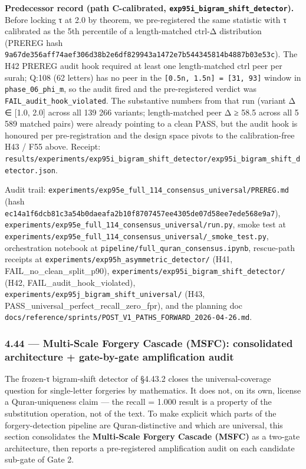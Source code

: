 \documentclass[
]{article}
\begin{document}
\textbf{Predecessor record (path C-calibrated,
\texttt{exp95i\_bigram\_shift\_detector}).} Before locking τ at 2.0 by
theorem, we pre-registered the same statistic with τ calibrated as the
5th percentile of a length-matched ctrl-Δ distribution (PREREG hash
\texttt{9a67de356aff74aef306d38b2e6df829943a1472e7b544345814b4887b03e53c}).
The H42 PREREG audit hook required at least one length-matched ctrl peer
per surah; Q:108 (62 letters) has no peer in the
\texttt{{[}0.5n,\ 1.5n{]}\ =\ {[}31,\ 93{]}} window in
\texttt{phase\_06\_phi\_m}, so the audit fired and the pre-registered
verdict was \texttt{FAIL\_audit\_hook\_violated}. The substantive
numbers from that run (variant Δ ∈ {[}1.0, 2.0{]} across all 139 266
variants; length-matched peer Δ ≥ 58.5 across all 5 589 matched pairs)
were already pointing to a clean PASS, but the audit hook is honoured
per pre-registration and the design space pivots to the calibration-free
H43 / F55 above. Receipt:
\texttt{results/experiments/exp95i\_bigram\_shift\_detector/exp95i\_bigram\_shift\_detector.json}.

Audit trail:
\texttt{experiments/exp95e\_full\_114\_consensus\_universal/PREREG.md}
(hash
\texttt{ec14a1f6dcb81c3a54b0daeafa2b10f8707457ee4305de07d58ee7ede568e9a7}),
\texttt{experiments/exp95e\_full\_114\_consensus\_universal/run.py},
smoke test at
\texttt{experiments/exp95e\_full\_114\_consensus\_universal/\_smoke\_test.py},
orchestration notebook at
\texttt{pipeline/full\_quran\_consensus.ipynb}, rescue-path receipts at
\texttt{experiments/exp95h\_asymmetric\_detector/} (H41,
FAIL\_no\_clean\_split\_p90),
\texttt{experiments/exp95i\_bigram\_shift\_detector/} (H42,
FAIL\_audit\_hook\_violated),
\texttt{experiments/exp95j\_bigram\_shift\_universal/} (H43,
PASS\_universal\_perfect\_recall\_zero\_fpr), and the planning doc
\texttt{docs/reference/sprints/POST\_V1\_PATHS\_FORWARD\_2026-04-26.md}.

\subsubsection{4.44 --- Multi-Scale Forgery Cascade (MSFC): consolidated
architecture + gate-by-gate amplification
audit}\label{multi-scale-forgery-cascade-msfc-consolidated-architecture-gate-by-gate-amplification-audit}

The frozen-τ bigram-shift detector of §4.43.2 closes the
universal-coverage question for single-letter forgeries by mathematics.
It does not, on its own, license a Quran-uniqueness claim --- the recall
= 1.000 result is a property of the substitution operation, not of the
text. To make explicit which parts of the forgery-detection pipeline are
Quran-distinctive and which are universal, this section consolidates the
\textbf{Multi-Scale Forgery Cascade (MSFC)} as a two-gate architecture,
then reports a pre-registered amplification audit on each candidate
sub-gate of Gate 2.
\end{document}
